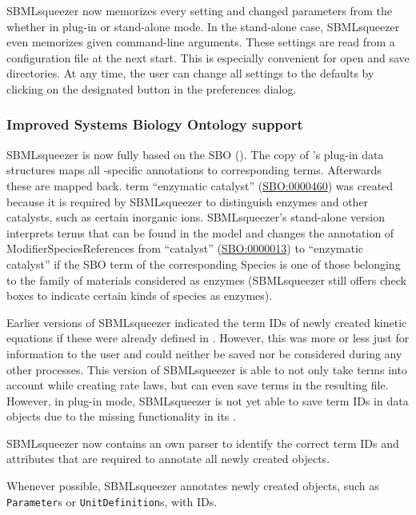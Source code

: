 SBMLsqueezer now memorizes every setting and changed parameters from the
\GUI whether in \CellDesigner plug-in or stand-alone
mode. In the stand-alone case, SBMLsqueezer even memorizes given command-line
arguments. These settings are read from a configuration file at the next start.
This is especially convenient for open and save directories. At any time, the
user can change all settings to the defaults by clicking on the designated button
in the preferences dialog.

\subsubsection{Improved Systems Biology Ontology support}

SBMLsqueezer is now fully based on the \acl{SBO} (\SBO). The \JSBML
copy of \CellDesigner's plug-in data structures maps all \CellDesigner-specific
annotations to corresponding \SBO terms. Afterwards these are mapped back. \SBO
term ``enzymatic catalyst''
(\href{identifiers.org/biomodels.sbo/SBO:0000460}{SBO:0000460}) was created
because it is required by SBMLsqueezer to distinguish enzymes and other
catalysts, such as certain inorganic ions. SBMLsqueezer's stand-alone version
interprets \SBO terms that can be found in the model and changes the annotation
of ModifierSpeciesReferences from ``catalyst''
(\href{identifiers.org/biomodels.sbo/SBO:0000013}{SBO:0000013}) to ``enzymatic
catalyst'' if the SBO term of the corresponding Species is one of those
belonging to the family of materials considered as enzymes (SBMLsqueezer still
offers check boxes to indicate certain kinds of species as enzymes).

Earlier versions of SBMLsqueezer indicated the \SBO term \acp{ID} of newly
created kinetic equations if these were already defined in \SBO. However, this
was more or less just for information to the user and could neither be saved nor
be considered during any other processes. This version of SBMLsqueezer is able
to not only take \SBO terms into account while creating rate laws, but can even
save \SBO terms in the resulting \SBML file. However, in \CellDesigner plug-in
mode, SBMLsqueezer is not yet able to save \SBO term \acp{ID} in \CellDesigner data
objects due to the missing functionality in its \API.

SBMLsqueezer now contains an own parser to identify the correct \SBO term \acp{ID} and
attributes that are required to annotate all newly created objects.

Whenever possible, SBMLsqueezer annotates newly created objects, such as
\texttt{Parameter}s or \texttt{UnitDefinition}s, with \SBO \acp{ID}.

